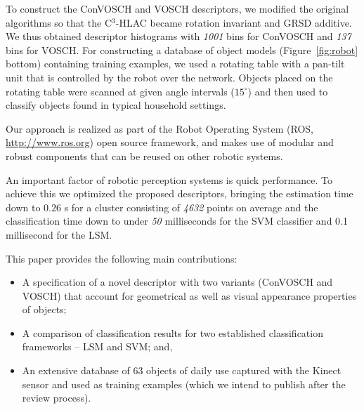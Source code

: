 \documentclass[a4paper, 10 pt, conference]{sty/ieeeconf}
\begin{document}
To construct the ConVOSCH and VOSCH descriptors, we modified the original algorithms
so that the C$^3$-HLAC became rotation invariant and GRSD 
additive. We thus obtained descriptor histograms with 
\emph{1001} bins for ConVOSCH and \emph{137} bins for VOSCH. %
For constructing a database of object models (Figure~\ref{fig:robot} bottom)
containing training examples, we used a rotating
table with a pan-tilt unit that is controlled by the robot over the
network. Objects placed on the rotating table were scanned at given
angle intervals ($15^\circ$) and then used to classify objects found in
typical household settings.

Our approach is realized as part of the Robot Operating System
(ROS, \url{http://www.ros.org}) open source framework, and makes
use of modular and robust components that can be reused on other robotic
systems.

An important factor of robotic perception systems is quick performance. To achieve this we optimized
the proposed descriptors, bringing the estimation time down to $0.26$ s for a cluster consisting of 
\emph{4632} points on average and the classification time down to under \emph{50} milliseconds
for the SVM classifier and 0.1 millisecond for the LSM. 

This paper provides the following main contributions:
\begin{itemize}
\item A specification of a novel descriptor with two variants (ConVOSCH and VOSCH) that account for
geometrical as well as visual appearance  properties of objects;
\item A comparison of classification results for two established classification
frameworks -- LSM and SVM; and,
\item An extensive database of 63 objects of daily use captured with the Kinect sensor
and used as training examples (which we intend to publish after the review process).
\end{itemize}
\end{document}
